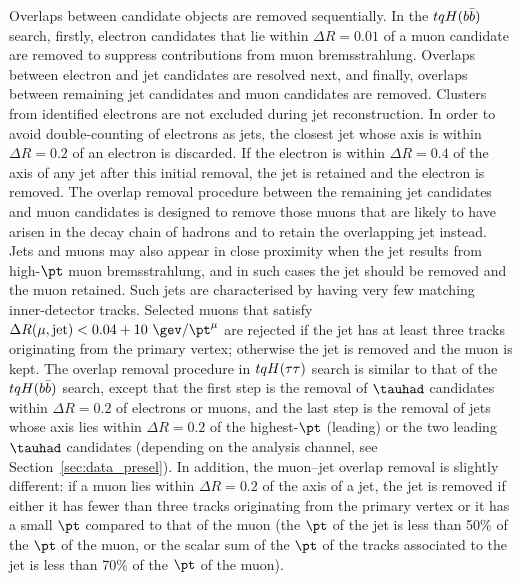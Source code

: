 Overlaps between candidate objects are removed sequentially. In the $tqH(b\bar{b})$ search, firstly, electron candidates that lie 
within $\Delta R = 0.01$ of a muon candidate are removed to suppress contributions from muon bremsstrahlung. 
Overlaps between electron and jet candidates are resolved next, and finally, overlaps between remaining jet candidates 
and muon candidates are removed. Clusters from identified electrons are not excluded during jet reconstruction. 
In order to avoid double-counting of electrons as jets, the closest jet whose axis is within ${\Delta}R = 0.2$ of an electron 
is discarded. If the electron is within ${\Delta}R = 0.4$ of the axis of any jet after this initial removal, the jet is retained and  the electron is removed.
The overlap removal procedure between the remaining jet candidates and muon candidates is designed to remove those muons 
that are likely to have arisen in the decay chain of hadrons and to retain the overlapping jet instead. 
Jets and muons may also appear in close proximity when the jet results from high-$\pt$ muon bremsstrahlung, 
and in such cases the jet should be removed and the muon retained. Such jets are characterised by having very 
few matching inner-detector tracks. Selected muons that satisfy $\Delta R(\mu,{\textrm{jet}}) < 0.04+10~\gev/\pt^\mu$ are rejected
if the jet has at least three tracks originating from the primary vertex; otherwise the jet is removed and the muon is kept.
The overlap removal procedure in $tqH(\tau\tau)$ search is similar to that of the $tqH(b\bar{b})$ search, except that the
first step is the removal of $\tauhad$ candidates within $\Delta R=0.2$ of electrons or muons, and the last step is the
removal of jets whose axis lies within $\Delta R=0.2$ of the highest-$\pt$ (leading) or the two leading $\tauhad$ candidates (depending on the
analysis channel, see Section~\ref{sec:data_presel}). In addition, the muon--jet overlap removal is slightly different:
if a muon lies within $\Delta R = 0.2$ of the axis of a jet, the jet is removed if either it has fewer than three tracks originating from the 
primary vertex or it has a small $\pt$ compared to that of the muon (the $\pt$ of the jet is less than 50\% of the $\pt$ of the muon,
or the scalar sum of the $\pt$ of the tracks associated to the jet is less than 70\% of the $\pt$ of the muon).

